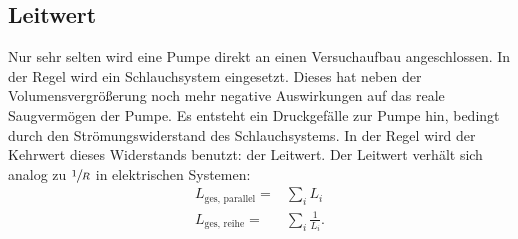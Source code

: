 \subsection{Leitwert}
Nur sehr selten wird eine Pumpe direkt an einen Versuchaufbau angeschlossen. In der Regel wird ein Schlauchsystem eingesetzt. Dieses hat neben der Volumensvergrößerung
noch mehr negative Auswirkungen auf das reale Saugvermögen der Pumpe. Es entsteht ein Druckgefälle zur Pumpe hin, bedingt durch den Strömungswiderstand des Schlauchsystems. In der Regel wird der Kehrwert dieses Widerstands benutzt: der Leitwert. Der Leitwert verhält sich analog zu $\sfrac{1}{R}$ in elektrischen
Systemen:
\begin{align}
	L_\text{ges, parallel}=&\sum_i L_i \\
	L_\text{ges, reihe}=&\sum_i \frac{1}{L_i}.
\end{align}
